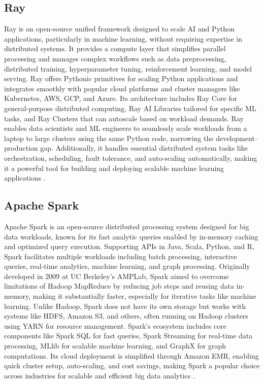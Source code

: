 \documentclass[conference]{IEEEtran}
\begin{document}
\subsection{Ray}
Ray is an open-source unified framework designed to scale AI and Python applications,
particularly in machine learning, without requiring expertise in distributed systems.
It provides a compute layer that simplifies parallel processing and manages complex workflows
such as data preprocessing, distributed training, hyperparameter tuning, reinforcement learning,
and model serving. Ray offers Pythonic primitives for scaling Python applications and integrates
smoothly with popular cloud platforms and cluster managers like Kubernetes, AWS, GCP, and
Azure. Its architecture includes Ray Core for general-purpose distributed computing, Ray AI
Libraries tailored for specific ML tasks, and Ray Clusters that can autoscale based on
workload demands. Ray enables data scientists and ML engineers to seamlessly scale workloads
from a laptop to large clusters using the same Python code, narrowing the development–production gap. 
Additionally, it handles essential distributed system tasks like orchestration,
scheduling, fault tolerance, and auto-scaling automatically, making it a powerful tool for
building and deploying scalable machine learning applications \cite{ray}.

\subsection{Apache Spark}
Apache Spark is an open-source distributed processing system designed for big data workloads,
known for its fast analytic queries enabled by in-memory caching and optimized query execution.
Supporting APIs in Java, Scala, Python, and R, Spark facilitates multiple workloads including
batch processing, interactive queries, real-time analytics, machine learning, and graph
processing. Originally developed in 2009 at UC Berkeley’s AMPLab, Spark aimed to overcome
limitations of Hadoop MapReduce by reducing job steps and reusing data in-memory, making it
substantially faster, especially for iterative tasks like machine learning. Unlike Hadoop,
Spark does not have its own storage but works with systems like HDFS, Amazon S3, and others,
often running on Hadoop clusters using YARN for resource management. Spark’s ecosystem
includes core components like Spark SQL for fast queries, Spark Streaming for real-time
data processing, MLlib for scalable machine learning, and GraphX for graph computations.
Its cloud deployment is simplified through Amazon EMR, enabling quick cluster setup, auto-scaling,
and cost savings, making Spark a popular choice across industries for scalable and efficient
big data analytics \cite{spark}.
\end{document}
